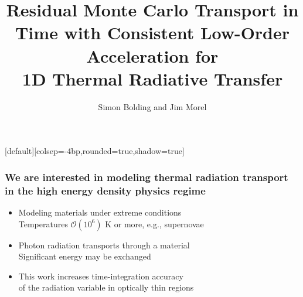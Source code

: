 \documentclass[xcolor=dvipsnames,hyperref={pdfpagelabels=false},unknownkeysallowed]{beamer}
\title[HOLO for TRT]{Residual Monte Carlo Transport in Time with Consistent Low-Order Acceleration for \\  1D Thermal Radiative Transfer}
\author[S.R. Bolding]{{Simon Bolding and  Jim Morel}}
\date{\vspace{-0.1in}{April 17 2017} }
\newcommand{\colb}[1]{{\color{blue} #1}}
\newcommand{\colG}[1]{{\color{Gray!110} #1}}
\newlength{\wideitemsep}
\let\olditem\item
\renewcommand{\item}{\setlength{\itemsep}{\wideitemsep}\olditem}
\begin{document}
[default][colsep=-4bp,rounded=true,shadow=true]

\def\beginpage{\null\vfill\bgroup
\offinterlineskip\leftskip=\z@}
\def\endpage{\egroup\eject}

\begin{frame}
    \titlepage \vspace{-0.213in}
    \begin{center}
    \end{center}    
\end{frame}

\setlength{\tabcolsep}{6pt}



\begin{frame}
\frametitle{We are interested in modeling thermal radiation transport \\ in the high energy
    density physics regime}
{\addtolength{\leftmargini}{-0.2in}
    \addtolength{\wideitemsep}{0.08in}
\begin{itemize}
    \item[] Modeling materials under extreme conditions \\ \colG{Temperatures $\mathcal{O}(10^6)$ K or more, e.g., supernovae}
    \item[] Photon radiation transports through a material \\ 
        \colG{Significant \colb{energy}  may be exchanged}
 \item[] This work increases time-integration accuracy \\ \colG{of the radiation variable in optically thin regions}
    \end{itemize}}
\end{frame}
\end{document}
